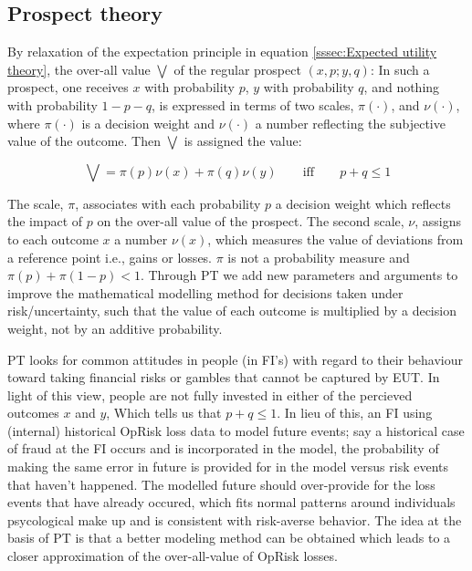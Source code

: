 \documentclass[]{DissertateUSU}
\begin{document}
\subsection{Prospect theory}
\label{ssec:Prospect theory}

By relaxation of the expectation principle in equation
\ref{sssec:Expected utility theory}, the over-all value
\(\mathbf{\bigvee}\) of the regular prospect \((x,p;y,q)\): In such a
prospect, one receives \(x\) with probability \(p\), \(y\) with
probability \(q\), and nothing with probability \(1-p-q\), is expressed
in terms of two scales, \(\pi(\cdot)\), and \(\nu(\cdot)\), where
\(\pi(\cdot)\) is a decision weight and \(\nu(\cdot)\) a number
reflecting the subjective value of the outcome. Then
\(\mathbf{\bigvee}\) is assigned the value:

\begin{equation}\label{eqn2}
\mathbf{\bigvee}=\pi(p)\nu(x)+\pi(q)\nu(y) \qquad\mbox{iff} \qquad p+q \leq 1
\end{equation}

The scale, \(\pi\), associates with each probability \(p\) a decision
weight which reflects the impact of \(p\) on the over-all value of the
prospect. The second scale, \(\nu\), assigns to each outcome \(x\) a
number \(\nu(x)\), which measures the value of deviations from a
reference point i.e., gains or losses. \(\pi\) is not a probability
measure and \(\pi(p) + \pi(1-p) < 1\). Through PT we add new parameters
and arguments to improve the mathematical modelling method for decisions
taken under risk/uncertainty, such that the value of each outcome is
multiplied by a decision weight, not by an additive probability.

PT looks for common attitudes in people (in FI's) with regard to their
behaviour toward taking financial risks or gambles that cannot be
captured by EUT. In light of this view, people are not fully invested in
either of the percieved outcomes \(x\) and \(y\), Which tells us that
\(p+q \leq 1\). In lieu of this, an FI using (internal) historical
OpRisk loss data to model future events; say a historical case of fraud
at the FI occurs and is incorporated in the model, the probability of
making the same error in future is provided for in the model versus risk
events that haven't happened. The modelled future should over-provide
for the loss events that have already occured, which fits normal
patterns around individuals psycological make up and is consistent with
risk-averse behavior. The idea at the basis of PT is that a better
modeling method can be obtained which leads to a closer approximation of
the over-all-value of OpRisk losses.
\end{document}
